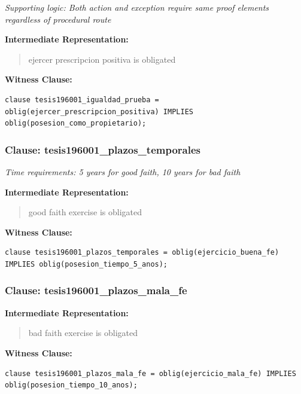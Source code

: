 \documentclass[11pt,a4paper]{article}
\begin{document}
\textit{Supporting logic: Both action and exception require same proof elements regardless of procedural route}

\textbf{Intermediate Representation:}

\begin{quote}
ejercer prescripcion positiva is obligated
\end{quote}

\textbf{Witness Clause:}

\begin{lstlisting}[style=witnessstyle, language=Witness]
clause tesis196001_igualdad_prueba = oblig(ejercer_prescripcion_positiva) IMPLIES oblig(posesion_como_propietario);
\end{lstlisting}

\subsubsection{Clause: tesis196001\_plazos\_temporales}

\textit{Time requirements: 5 years for good faith, 10 years for bad faith}

\textbf{Intermediate Representation:}

\begin{quote}
good faith exercise is obligated
\end{quote}

\textbf{Witness Clause:}

\begin{lstlisting}[style=witnessstyle, language=Witness]
clause tesis196001_plazos_temporales = oblig(ejercicio_buena_fe) IMPLIES oblig(posesion_tiempo_5_anos);
\end{lstlisting}

\subsubsection{Clause: tesis196001\_plazos\_mala\_fe}

\textbf{Intermediate Representation:}

\begin{quote}
bad faith exercise is obligated
\end{quote}

\textbf{Witness Clause:}

\begin{lstlisting}[style=witnessstyle, language=Witness]
clause tesis196001_plazos_mala_fe = oblig(ejercicio_mala_fe) IMPLIES oblig(posesion_tiempo_10_anos);
\end{lstlisting}
\end{document}
